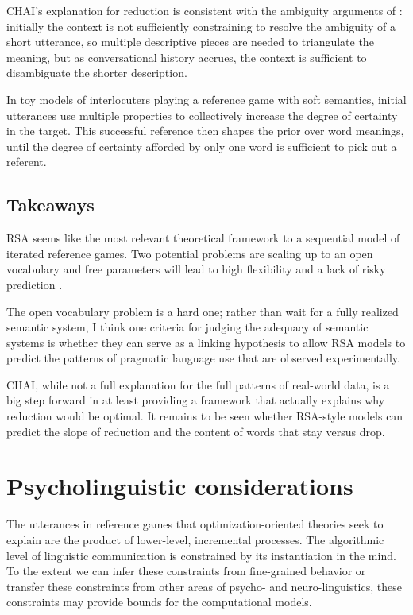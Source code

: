 \documentclass[]{article}
\begin{document}
CHAI's explanation for reduction is consistent with the ambiguity arguments of \citet{piantadosi2012}: initially the context is not sufficiently constraining to resolve the ambiguity of a short utterance, so multiple descriptive pieces are needed to triangulate the meaning, but as conversational history accrues, the context is sufficient to disambiguate the shorter description. 

In toy models of interlocuters playing a reference game with soft semantics, initial utterances use multiple properties to collectively increase the degree of certainty in the target. This successful reference then shapes the prior over word meanings, until the degree of certainty afforded by only one word is sufficient to pick out a referent. 


\subsection{Takeaways}
RSA seems like the most relevant theoretical framework to a sequential model of iterated reference games. Two potential problems are scaling up to an open vocabulary and free parameters will lead to high flexibility and a lack of risky prediction \citep{meehl1990}.

The open vocabulary problem is a hard one; rather than wait for a fully realized semantic system, I think one criteria for judging the adequacy of semantic systems is whether they can serve as a linking hypothesis to allow RSA models to predict the patterns of pragmatic language use that are observed experimentally. 

CHAI, while not a full explanation for the full patterns of real-world data, is a big step forward in at least providing a framework that actually explains why reduction would be optimal. It remains to be seen whether RSA-style models can predict the slope of reduction and the content of words that stay versus drop. 

\section{Psycholinguistic considerations}

The utterances in reference games that optimization-oriented theories seek to explain are the product of lower-level, incremental processes. The algorithmic level of linguistic communication is constrained by its instantiation in the mind. To the extent we can infer these constraints from fine-grained behavior or transfer these constraints from other areas of psycho- and neuro-linguistics, these constraints may provide bounds for the computational models. 
\end{document}
